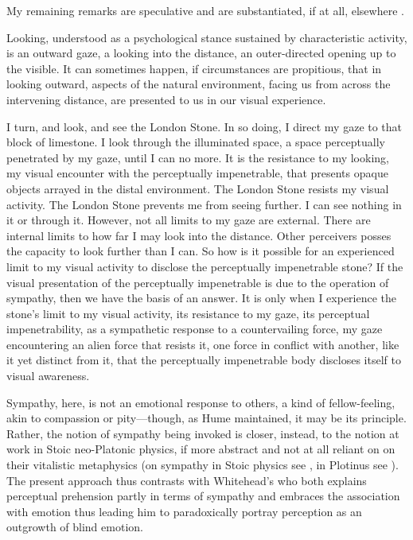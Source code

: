 \documentclass[12pt]{article}
\begin{document}
My remaining remarks are speculative and are substantiated, if at all, elsewhere \citep{Kalderon:2015aa}.

Looking, understood as a psychological stance sustained by characteristic activity, is an outward gaze, a looking into the distance, an outer-directed opening up to the visible. It can sometimes happen, if circumstances are propitious, that in looking outward, aspects of the natural environment, facing us from across the intervening distance, are presented to us in our visual experience. 

I turn, and look, and see the London Stone. In so doing, I direct my gaze to that block of limestone. I look through the illuminated space, a space perceptually penetrated by my gaze, until I can no more. It is the resistance to my looking, my visual encounter with the perceptually impenetrable, that presents opaque objects arrayed in the distal environment. The London Stone resists my visual activity. The London Stone prevents me from seeing further. I can see nothing in it or through it. However, not all limits to my gaze are external. There are internal limits to how far I may look into the distance. Other perceivers posses the capacity to look further than I can. So how is it possible for an experienced limit to my visual activity to disclose the perceptually impenetrable stone? If the visual presentation of the perceptually impenetrable is due to the operation of sympathy, then we have the basis of an answer. It is only when I experience the stone’s limit to my visual activity, its resistance to my gaze, its perceptual impenetrability, as a sympathetic response to a countervailing force, my gaze encountering an alien force that resists it, one force in conflict with another, like it yet distinct from it, that the perceptually impenetrable body discloses itself to visual awareness.

Sympathy, here, is not an emotional response to others, a kind of fellow-feeling, akin to compassion or pity---though, as Hume maintained, it may be its principle. Rather, the notion of sympathy being invoked is closer, instead, to the notion at work in Stoic neo-Platonic physics, if more abstract and not at all reliant on on their vitalistic metaphysics (on sympathy in Stoic physics see \citealt{Brouwer:2015ee}, in Plotinus see \citealt{Emilsson:2015wf}). The present approach thus contrasts with Whitehead’s \citeyearpar{Whitehead:1978zr} who both explains perceptual prehension partly in terms of sympathy and embraces the association with emotion thus leading him to paradoxically portray perception as an outgrowth of blind emotion.
\end{document}
